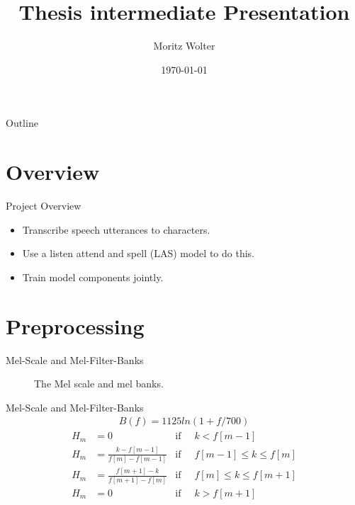 \documentclass{beamer}
\title{Thesis intermediate Presentation}
\author{Moritz Wolter}
\date{\today}
\begin{document}
\begin{frame}
  \titlepage
\end{frame}


\begin{frame}{Outline}
  \tableofcontents
\end{frame}

\section{Overview}
\begin{frame}{Project Overview}
	\begin{itemize}
		\item Transcribe speech utterances to characters. 
		\item Use a listen attend and spell (LAS) model to do this.
		\item Train model components jointly.
	\end{itemize}
\end{frame}



\section{Preprocessing}
\begin{frame}{Mel-Scale and Mel-Filter-Banks}
\begin{figure}
	
	
	\caption{The Mel scale and mel banks.}
	\label{fig:melBank}
\end{figure}
\end{frame}

\begin{frame}{Mel-Scale and Mel-Filter-Banks}
\begin{align}
	B(f) = 1125 ln(1 + f / 700)
\end{align}
\begin{align}
	H_m &= 0 				                       & \text{if}\;\; & k < f[m-1] \\
	H_m &= \frac{k      - f[m-1] }{f[m] - f[m-1]}  &\text{if}\;\; & f[m-1] \leq k \leq f[m] \\
	H_m &= \frac{f[m+1] - k      }{f[m + 1] - f[m]}&\text{if}\;\; & f[m] \leq k \leq f[m+1] \\
	H_m &= 0									   &\text{if}\;\; & k > f[m+1] 
\end{align}
\end{frame}
\end{document}
